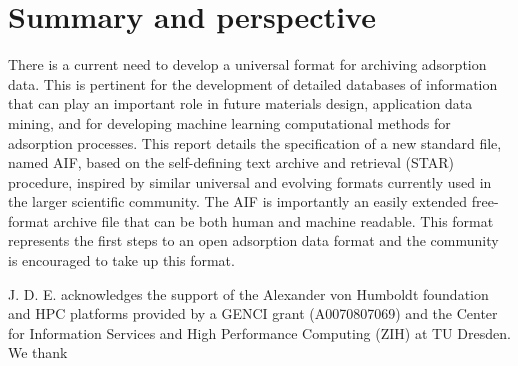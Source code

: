 \documentclass[journal=langd5,manuscript=article]{achemso}
\begin{document}
\section{Summary and perspective}
There is a current need to develop a universal format for archiving adsorption data.
This is pertinent for the development of detailed databases of information that can play an important role in future materials design, application data mining, and for developing machine learning computational methods for adsorption processes. \cite{10.1021/acs.chemmater.9b03376}
This report details the specification of a new standard file, named AIF, based on the self-defining text archive and retrieval (STAR) procedure, inspired by similar universal and evolving formats currently used in the larger scientific community.
The AIF is importantly an easily extended free-format archive file that can be both human and machine readable.
This format represents the first steps to an open adsorption data format and the community is encouraged to take up this format.




  




\begin{acknowledgement}
  J. D. E. acknowledges the support of the Alexander von Humboldt foundation and HPC platforms provided by a GENCI grant (A0070807069) and the Center for Information Services and High Performance Computing (ZIH) at TU Dresden.
  We thank 
\end{acknowledgement}
\end{document}
